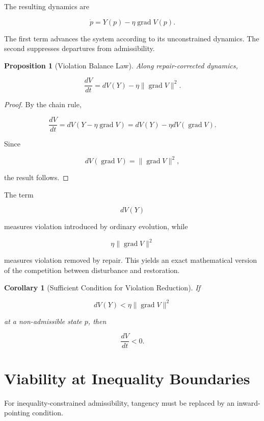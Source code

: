 \documentclass[11pt,oneside]{book}
\numberwithin{equation}{chapter}
\theoremstyle{definition}
\theoremstyle{plain}
\newtheorem{proposition}[definition]{Proposition}
\newtheorem{corollary}[definition]{Corollary}
\DeclareMathOperator{\grad}{grad}
\begin{document}
The resulting dynamics are

\[
\boxed{
\dot p
=
Y(p)
-
\eta\grad V(p).
}
\]

The first term advances the system according to its unconstrained dynamics.
The second suppresses departures from admissibility.

\begin{proposition}[Violation Balance Law]

Along repair-corrected dynamics,

\[
\frac{dV}{dt}
=
dV(Y)
-
\eta
\|\grad V\|^2.
\]

\end{proposition}

\begin{proof}

By the chain rule,

\[
\frac{dV}{dt}
=
dV
\left(
Y-\eta\grad V
\right)
=
dV(Y)
-
\eta dV(\grad V).
\]

Since

\[
dV(\grad V)
=
\|\grad V\|^2,
\]

the result follows.

\end{proof}

The term

\[
dV(Y)
\]

measures violation introduced by ordinary evolution, while

\[
\eta\|\grad V\|^2
\]

measures violation removed by repair. This yields an exact mathematical version of the competition between disturbance and restoration.

\begin{corollary}[Sufficient Condition for Violation Reduction]

If

\[
dV(Y)
<
\eta
\|\grad V\|^2
\]

at a non-admissible state \(p\), then

\[
\frac{dV}{dt}<0.
\]

\end{corollary}

\section{Viability at Inequality Boundaries}

For inequality-constrained admissibility, tangency must be replaced by an
inward-pointing condition.
\end{document}
